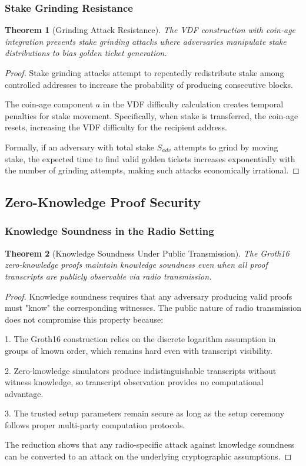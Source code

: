 \documentclass[11pt,a4paper]{article}
\newtheorem{theorem}{Theorem}[section]
\begin{document}
\subsubsection{Stake Grinding Resistance}

\begin{theorem}[Grinding Attack Resistance]
The VDF construction with coin-age integration prevents stake grinding attacks where adversaries manipulate stake distributions to bias golden ticket generation.
\end{theorem}

\begin{proof}
Stake grinding attacks attempt to repeatedly redistribute stake among controlled addresses to increase the probability of producing consecutive blocks.

The coin-age component $a$ in the VDF difficulty calculation creates temporal penalties for stake movement. Specifically, when stake is transferred, the coin-age resets, increasing the VDF difficulty for the recipient address.

Formally, if an adversary with total stake $S_{adv}$ attempts to grind by moving stake, the expected time to find valid golden tickets increases exponentially with the number of grinding attempts, making such attacks economically irrational.
\end{proof}

\subsection{Zero-Knowledge Proof Security}

\subsubsection{Knowledge Soundness in the Radio Setting}

\begin{theorem}[Knowledge Soundness Under Public Transmission]
The Groth16 zero-knowledge proofs maintain knowledge soundness even when all proof transcripts are publicly observable via radio transmission.
\end{theorem}

\begin{proof}
Knowledge soundness requires that any adversary producing valid proofs must "know" the corresponding witnesses. The public nature of radio transmission does not compromise this property because:

1. The Groth16 construction relies on the discrete logarithm assumption in groups of known order, which remains hard even with transcript visibility.

2. Zero-knowledge simulators produce indistinguishable transcripts without witness knowledge, so transcript observation provides no computational advantage.

3. The trusted setup parameters remain secure as long as the setup ceremony follows proper multi-party computation protocols.

The reduction shows that any radio-specific attack against knowledge soundness can be converted to an attack on the underlying cryptographic assumptions.
\end{proof}
\end{document}
